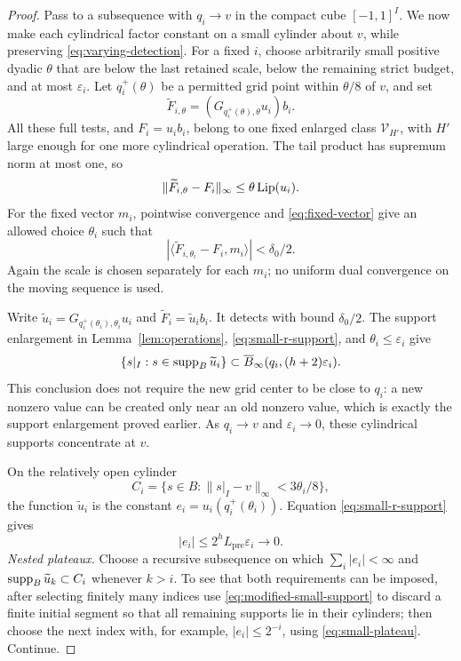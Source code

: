 \begin{proof}
Pass to a subsequence with \(q_i\to v\) in the compact cube
\([-1,1]^I\). We now make each cylindrical factor constant on a small
cylinder about \(v\), while preserving \eqref{eq:varying-detection}. For a fixed \(i\),
choose arbitrarily small positive dyadic \(\theta\) that are below
the last retained scale, below the remaining strict budget, and
at most \(\varepsilon_i\). Let \(q_i^+(\theta)\) be a permitted
grid point within \(\theta/8\) of \(v\), and set
\[
 \widetilde F_{i,\theta}
             =(G_{q_i^+(\theta),\theta}u_i)b_i.
\]
All these full tests, and \(F_i=u_i b_i\), belong to one fixed
enlarged class \(\mathcal V_{H'}\), with \(H'\) large enough for one
more cylindrical operation. The tail product has supremum norm at
most one, so
\[
 \|\widetilde F_{i,\theta}-F_i\|_\infty
       \leq\theta\operatorname{Lip}(u_i).
\]
For the fixed vector \(m_i\), pointwise convergence and
\eqref{eq:fixed-vector} give an allowed choice \(\theta_i\) such that
\begin{equation}
 |\langle\widetilde F_{i,\theta_i}-F_i,m_i\rangle|
                                      <\delta_0/2.           \label{eq:retained-detection}
\end{equation}
Again the scale is chosen separately for each \(m_i\); no uniform
dual convergence on the moving sequence is used.

Write \(\widetilde u_i=G_{q_i^+(\theta_i),\theta_i}u_i\) and
\(\widetilde F_i=\widetilde u_i b_i\). It detects with bound
\(\delta_0/2\). The support enlargement in
Lemma~\ref{lem:operations}, \eqref{eq:small-r-support}, and \(\theta_i\leq\varepsilon_i\)
give
\begin{equation}
 \{s|_I:s\in\operatorname{supp}_B\widetilde u_i\}
        \subset\overline B_\infty(q_i,(h+2)\varepsilon_i).  \label{eq:modified-small-support}
\end{equation}
This conclusion does not require the new grid center to be close to
\(q_i\): a new nonzero value can be created only near an old nonzero
value, which is exactly the support enlargement proved earlier.
As \(q_i\to v\) and \(\varepsilon_i\to0\), these cylindrical supports
concentrate at \(v\).

On the relatively open cylinder
\[
 C_i=\{s\in B:\|s|_I-v\|_\infty<3\theta_i/8\},
\]
the function \(\widetilde u_i\) is the constant
\(e_i=u_i(q_i^+(\theta_i))\). Equation \eqref{eq:small-r-support} gives
\begin{equation}
                   |e_i|\leq2^hL_{\mathrm{pre}}\varepsilon_i
                                \longrightarrow0.           \label{eq:small-plateau}
\end{equation}
\emph{Nested plateaux.}
Choose a recursive subsequence on which
\(\sum_i|e_i|<\infty\) and \(\operatorname{supp}_B\widetilde u_k\subset C_i\)
whenever \(k>i\). To see that both requirements can be imposed,
after selecting finitely many indices use \eqref{eq:modified-small-support} to discard a finite
initial segment so that all remaining supports lie in their
cylinders; then choose the next index with, for example,
\(|e_i|\leq2^{-i}\), using \eqref{eq:small-plateau}. Continue.


\end{proof}
